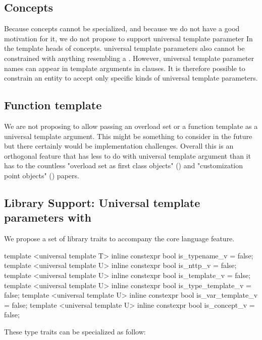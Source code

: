 \documentclass{wg21}
\begin{document}
\subsection{Concepts}

Because concepts cannot be specialized, and because we do not have a good motivation for it, we do not propose to support universal template parameter
In the template heads of concepts. universal template parameters also cannot be constrained with anything resembling a .
However, universal template parameter names can appear in template arguments in  clauses.
It is therefore possible to constrain an entity to accept only specific kinds of universal template parameters.


\subsection{Function template}


We are not proposing to allow passing an overload set or a function template as a universal template argument.
This might be something to consider in the future but there certainly would be implementation challenges.
Overall this is an orthogonal feature that has less to do with universal template argument than it has to the countless
"overload set as first class objects" () and "customization point objects" () papers.


\subsection{Library Support: Universal template parameters with }

We propose a set of library traits to accompany the core language feature.


\begin{colorblock}
template <universal template T>
inline constexpr bool is_typename_v = false;
template <universal template U>
inline constexpr bool is_nttp_v = false;
template <universal template U>
inline constexpr bool is_template_v = false;
template <universal template U>
inline constexpr bool is_type_template_v = false;
template <universal template U>
inline constexpr bool is_var_template_v = false;
template <universal template U>
inline constexpr bool is_concept_v = false;
\end{colorblock}

These type traits can be specialized as follow:
\end{document}
